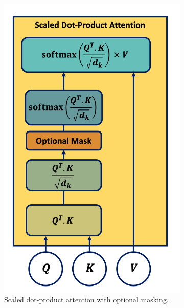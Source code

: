 \begin{figure}[h!]
    \centering
    \begin{subfigure}[b]{0.49\textwidth}
        \centering
        \includegraphics[scale=0.65]{Images/ML/scaledDotAtt.png}
        \caption{Scaled dot-product attention with optional masking.} 
        \label{fig:scaledDotAtt}
    \end{subfigure}
    \hfill
    \begin{subfigure}[b]{0.5\textwidth}
        \centering

\end{subfigure}
\end{figure}
